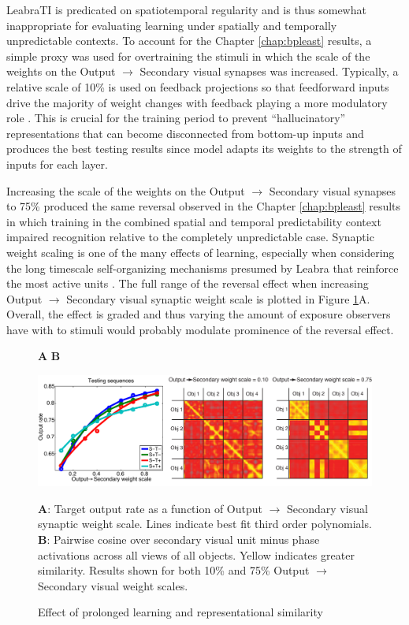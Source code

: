 \documentclass[dwyatte_dissertation.tex]{subfiles}
\begin{document}
LeabraTI is predicated on spatiotemporal regularity and is thus somewhat inappropriate for evaluating learning under spatially and temporally unpredictable contexts. To account for the Chapter \ref{chap:bpleast} results, a simple proxy was used for overtraining the stimuli in which the scale of the weights on the Output $\rightarrow$ Secondary visual synapses was increased. Typically, a relative scale of 10\% is used on feedback projections so that feedforward inputs drive the majority of weight changes with feedback  playing a more modulatory role \cite{CrickKoch98,ShermanGuillery98}. This is crucial for the training period to prevent ``hallucinatory'' representations that can become disconnected from bottom-up inputs and produces the best testing results since model adapts its weights to the strength of inputs for each layer. 

Increasing the scale of the weights on the Output $\rightarrow$ Secondary visual synapses to 75\% produced the same reversal observed in the Chapter \ref{chap:bpleast} results in which training in the combined spatial and temporal predictability context impaired recognition relative to the completely unpredictable case. Synaptic weight scaling is one of the many effects of learning, especially when considering the long timescale self-organizing mechanisms presumed by Leabra that reinforce the most active units \cite{OReillyMunakata00,OReillyMunakataFrankEtAl12}. The full range of the reversal effect when increasing Output $\rightarrow$ Secondary visual synaptic weight scale is plotted in Figure \ref{fig:sims_ramp_distmatrix}A. Overall, the effect is graded and thus varying the amount of exposure observers have with to stimuli would probably modulate prominence of the reversal effect. 

\begin{figure}[h!]
\hspace{2mm} \textbf{A} \hspace{56mm} \textbf{B}
\begin{center}
\includegraphics[width=160mm]{figs/chap_sims/sims_ramp_distmatrix_montage.pdf}
\end{center}
\caption{Effect of prolonged learning and representational similarity}{\textbf{A}: Target output rate as a function of Output $\rightarrow$ Secondary visual synaptic weight scale. Lines indicate best fit third order polynomials. \textbf{B}: Pairwise cosine over secondary visual unit minus phase activations across all views of all objects. Yellow indicates greater similarity. Results shown for both 10\% and 75\% Output $\rightarrow$ Secondary visual weight scales.}
\label{fig:sims_ramp_distmatrix}
\end{figure}
\end{document}
